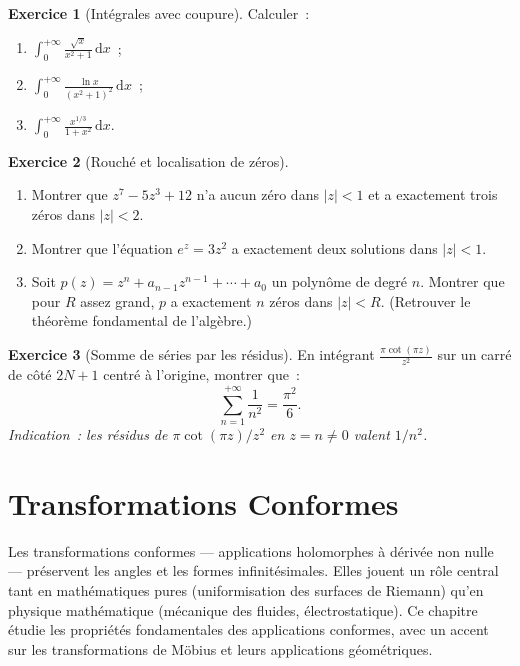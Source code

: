 \documentclass[12pt,a4paper,openany]{book}
\theoremstyle{definition}
\newtheorem{exercice}{Exercice}[chapter]
\theoremstyle{plain}
\theoremstyle{remark}
\newcommand{\dd}{\mathrm{d}}
\newcommand{\abs}[1]{\left|#1\right|}
\begin{document}
\begin{exercice}[Intégrales avec coupure]\label{exo:int-coupure}
Calculer~:
\begin{enumerate}[label=\alph*)]
  \item $\displaystyle \int_0^{+\infty} \frac{\sqrt{x}}{x^2 + 1}\, \dd x$~;
  \item $\displaystyle \int_0^{+\infty} \frac{\ln x}{(x^2+1)^2}\, \dd x$~;
  \item $\displaystyle \int_0^{+\infty} \frac{x^{1/3}}{1+x^2}\, \dd x$.
\end{enumerate}
\end{exercice}

\begin{exercice}[Rouché et localisation de zéros]\label{exo:rouche}
\begin{enumerate}[label=\alph*)]
  \item Montrer que $z^7 - 5z^3 + 12$ n'a aucun zéro dans $\abs{z} < 1$
    et a exactement trois zéros dans $\abs{z} < 2$.
  \item Montrer que l'équation $e^z = 3z^2$ a exactement deux solutions dans
    $\abs{z} < 1$.
  \item Soit $p(z) = z^n + a_{n-1}z^{n-1} + \cdots + a_0$ un polynôme de degré $n$.
    Montrer que pour $R$ assez grand, $p$ a exactement $n$ zéros dans $\abs{z} < R$.
    (Retrouver le théorème fondamental de l'algèbre.)
\end{enumerate}
\end{exercice}

\begin{exercice}[Somme de séries par les résidus]\label{exo:somme-series}
En intégrant $\frac{\pi\cot(\pi z)}{z^2}$ sur un carré de côté $2N+1$
centré à l'origine, montrer que~:
\[
  \sum_{n=1}^{+\infty} \frac{1}{n^2} = \frac{\pi^2}{6}.
\]
\emph{Indication~: les résidus de $\pi\cot(\pi z)/z^2$ en $z = n \neq 0$ valent $1/n^2$.}
\end{exercice}

\chapter{Transformations Conformes}\label{chap:conforme}

\minitoc
\vspace{1em}

Les transformations conformes --- applications holomorphes à dérivée non nulle ---
préservent les angles et les formes infinitésimales. Elles jouent un rôle central
tant en mathématiques pures (uniformisation des surfaces de Riemann) qu'en physique
mathématique (mécanique des fluides, électrostatique). Ce chapitre étudie les
propriétés fondamentales des applications conformes, avec un accent sur les
transformations de Möbius et leurs applications géométriques.
\end{document}
